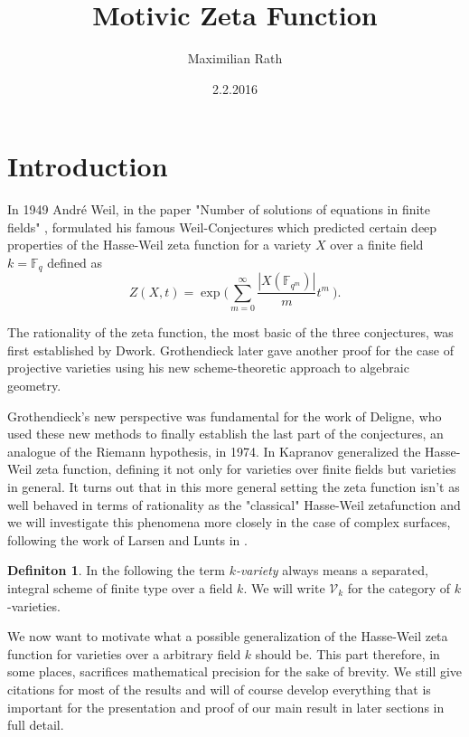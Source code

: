 \documentclass[11pt, a4paper, german]{article}
\author{Maximilian Rath}
\date{2.2.2016}
\title{Motivic Zeta Function}
\theoremstyle{plain}
\newtheorem{theorem}{Theorem}
\theoremstyle{definition}
\newtheorem{definition}[theorem]{Definiton}
\begin{document}
\maketitle
\section{Introduction}

In 1949 Andr\'e Weil, in the paper "Number of solutions of equations in finite fields" \cite{weil1949}, formulated his famous Weil-Conjectures
which predicted certain deep properties of the Hasse-Weil zeta function for a variety $X$ over a finite field $k = \mathbb{F}_q$ defined as
\[
    Z(X,t) = \exp \big(\sum_{m=0}^\infty \frac{|X(\mathbb{F}_{q^m})|}{m} t^m \ \big).
\]

The rationality of the zeta function, the most basic of the three conjectures, was first established by Dwork. Grothendieck later gave another
proof for the case of projective varieties using his new scheme-theoretic approach to algebraic geometry. 


Grothendieck's new perspective was fundamental for the work of Deligne, who used these new methods to finally establish the 
last part of the conjectures, an analogue of the Riemann hypothesis, in 1974.
In \cite{kapranov} Kapranov generalized the Hasse-Weil zeta function, defining it not only for varieties over finite fields
but varieties in general. It turns out that in this more general setting the zeta function isn't as well behaved in terms of rationality as
the "classical" Hasse-Weil zetafunction and we will investigate this phenomena more closely in the case of complex surfaces, following the 
work of Larsen and Lunts in \cite{MR1996804}.

\begin{definition}
    In the following the term \emph{$k$-variety} always means a separated, integral scheme of finite type over a field $k$.
    We will write $\mathcal{V}_k$ for the category of $k$-varieties.
\end{definition}

We now want to motivate what a possible generalization of the Hasse-Weil zeta function for varieties over a arbitrary field $k$ should be.
This part therefore, in some places, sacrifices mathematical precision for the sake of brevity.  
We still give citations for most of the results and will of course develop everything that is important for the presentation and proof 
of our main result in later sections in full detail.
\end{document}

